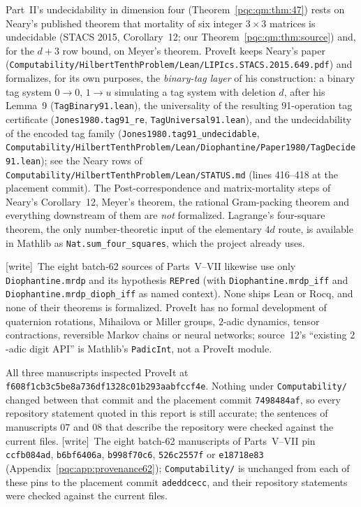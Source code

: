 \documentclass[11pt,letterpaper]{article}
\numberwithin{equation}{section}
\theoremstyle{definition}
\theoremstyle{remark}
\newcommand{\code}[1]{\nolinkurl{#1}}
\newcommand{\wtag}{\textup{[write]}}
\newcommand{\snapshot}{\texttt{f608f1cb3c5be8a736df1328c01b293aabfccf4e}}
\begin{document}
Part~II's undecidability in dimension four (Theorem~\ref{pqc:qm:thm:47})
rests on Neary's published theorem that mortality of six integer $3\times3$
matrices is undecidable (STACS 2015, Corollary~12; our
Theorem~\ref{pqc:qm:thm:source}) and, for the $d+3$ row bound, on Meyer's
theorem. ProveIt keeps Neary's paper
(\code{Computability/HilbertTenthProblem/Lean/LIPIcs.STACS.2015.649.pdf}) and
formalizes, for its own purposes, the \emph{binary-tag layer} of his
construction: a binary tag system $0\to0$, $1\to u$ simulating a tag system
with deletion $d$, after his Lemma~9 (\code{TagBinary91.lean}), the
universality of the resulting 91-operation tag certificate
(\code{Jones1980.tag91_re}, \code{TagUniversal91.lean}), and the
undecidability of the encoded tag family (\code{Jones1980.tag91_undecidable},
\code{Computability/HilbertTenthProblem/Lean/Diophantine/Paper1980/TagDecide91.lean});
see the Neary rows of \code{Computability/HilbertTenthProblem/Lean/STATUS.md}
(lines 416--418 at the placement commit). The Post-correspondence and
matrix-mortality steps of Neary's Corollary~12, Meyer's theorem, the rational
Gram-packing theorem and everything downstream of them are \emph{not}
formalized. Lagrange's four-square theorem, the only number-theoretic input
of the elementary $4d$ route, is available in Mathlib as
\code{Nat.sum_four_squares}, which the project already uses.

\wtag\ The eight batch-62 sources of Parts~V--VII likewise use only
\code{Diophantine.mrdp} and its hypothesis \code{REPred} (with
\code{Diophantine.mrdp_iff} and \code{Diophantine.mrdp_dioph_iff} as named context).
None ships Lean or Rocq, and none of their theorems is formalized. ProveIt has no
formal development of quaternion rotations, Mihailova or Miller groups,
$2$-adic dynamics, tensor contractions, reversible Markov chains or neural
networks; source~12's ``existing $2$-adic digit API'' is Mathlib's
\code{PadicInt}, not a ProveIt module.

All three manuscripts inspected ProveIt at \snapshot{}. Nothing under
\code{Computability/} changed between that commit and the placement commit
\code{7498484af}, so every repository statement quoted in this report is
still accurate; the sentences of manuscripts 07 and 08 that describe the
repository were checked against the current files.
\wtag\ The eight batch-62 manuscripts of Parts~V--VII pin \code{ccfb084ad},
\code{b6bf6406a}, \code{b998f70c6}, \code{526c2557f} or \code{e18718e83}
(Appendix~\ref{pqc:app:provenance62}); \code{Computability/} is unchanged from
each of these pins to the placement commit \code{adeddcecc}, and their
repository statements were checked against the current files.
\end{document}
